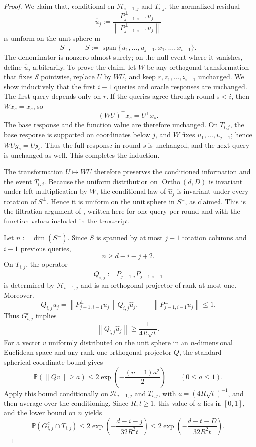 \documentclass[11pt]{article}
\newcommand{\Pbb}{\mathbb{P}}
\newcommand{\norm}[1]{\left\lVert #1\right\rVert}
\newcommand{\Ortho}{\operatorname{Ortho}}
\begin{document}
\begin{proof}
We claim that, conditional on \(\mathcal H_{i-1,j}\) and \(T_{i,j}\), the normalized residual
\[
\widehat u_j:=
\frac{P_{j-1,i-1}^{\perp}u_j}
{\norm{P_{j-1,i-1}^{\perp}u_j}}
\]
is uniform on the unit sphere in
\[
S^\perp,
\qquad
S:=\operatorname{span}\{u_1,\ldots,u_{j-1},x_1,\ldots,x_{i-1}\}.
\]
The denominator is nonzero almost surely; on the null event where it vanishes, define \(\widehat u_j\) arbitrarily.
To prove the claim, let \(W\) be any orthogonal transformation that fixes \(S\) pointwise, replace \(U\) by \(WU\),
and keep \(r,z_1,\ldots,z_{i-1}\) unchanged. We show inductively that the first \(i-1\) queries and oracle responses
are unchanged. The first query depends only on \(r\). If the queries agree through round \(s<i\), then \(W x_s=x_s\),
so
\[
(WU)^\top x_s=U^\top x_s.
\]
The base response and the function value are therefore unchanged. On \(T_{i,j}\), the base response is supported on
coordinates below \(j\), and \(W\) fixes \(u_1,\ldots,u_{j-1}\); hence \(WUg_s=Ug_s\). Thus the full response in
round \(s\) is unchanged, and the next query is unchanged as well. This completes the induction.

The transformation \(U\mapsto WU\) therefore preserves the conditioned information and the event \(T_{i,j}\).
Because the uniform distribution on \(\Ortho(d,D)\) is invariant under left multiplication by \(W\), the conditional
law of \(\widehat u_j\) is invariant under every rotation of \(S^\perp\). Hence it is uniform on the unit sphere in
\(S^\perp\), as claimed. This is the filtration argument of
\citet[Appendix~B.1]{ArjevaniEtAl2019}, written here for one query per round and with the function values included in
the transcript.

Let \(n:=\dim(S^\perp)\). Since \(S\) is spanned by at most \(j-1\) rotation columns and \(i-1\) previous queries,
\[
n\ge d-i-j+2.
\]
On \(T_{i,j}\), the operator
\[
Q_{i,j}:=P_{j-1,i}P_{j-1,i-1}^\perp
\]
is determined by \(\mathcal H_{i-1,j}\) and is an orthogonal projector of rank at most one. Moreover,
\[
Q_{i,j}u_j
=
\norm{P_{j-1,i-1}^{\perp}u_j}\,Q_{i,j}\widehat u_j,
\qquad
\norm{P_{j-1,i-1}^{\perp}u_j}\le1.
\]
Thus \(G_{i,j}^c\) implies
\[
\norm{Q_{i,j}\widehat u_j}\ge \frac{1}{4R\sqrt t}.
\]
For a vector \(v\) uniformly distributed on the unit sphere in an \(n\)-dimensional Euclidean space and any
rank-one orthogonal projector \(Q\), the standard spherical-coordinate bound gives
\[
\Pbb\left(\norm{Qv}\ge a\right)
\le
2\exp\left(-\frac{(n-1)a^2}{2}\right)
\qquad (0\le a\le1).
\]
Apply this bound conditionally on \(\mathcal H_{i-1,j}\) and \(T_{i,j}\), with
\(a=(4R\sqrt t)^{-1}\), and then average over the conditioning. Since \(R,t\ge1\), this value of \(a\) lies in
\([0,1]\), and the lower bound on \(n\) yields
\[
\Pbb\left(G_{i,j}^c\cap T_{i,j}\right)
\le
2\exp\left(-\frac{d-i-j}{32R^2t}\right)
\le
2\exp\left(-\frac{d-t-D}{32R^2t}\right).
\]


\end{proof}
\end{document}
